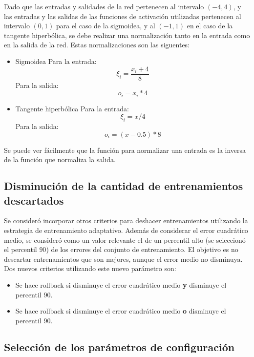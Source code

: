 \documentclass[a4paper,10pt]{article}
\begin{document}
        Dado que las entradas y salidades de la red pertenecen al intervalo $(-4, 4)$, y las entradas y las salidas de las funciones de activación utilizadas 
        pertenecen al intervalo $(0,1)$ para el caso de la sigmoidea, y al $(-1,1)$ en el caso de la tangente hiperbólica, se debe realizar una normalización 
        tanto en la entrada como en la salida de la red. Estas normalizaciones son las siguentes:

        \begin{itemize}
            \item Sigmoidea
                Para la entrada: \[ \xi_{i} = \frac{x_{i} + 4}{8} \]
                Para la salida: \[ o_{i} = x_{i} * 4 \]
            \item Tangente hiperbólica
                Para la entrada: \[ \xi_{i} = x / 4 \]
                Para la salida: \[ o_{i} = (x - 0.5) * 8 \]
        \end{itemize}

        Se puede ver fácilmente que la función para normalizar una entrada es la inversa de la función que normaliza la salida.

    \subsection{Disminución de la cantidad de entrenamientos descartados}

        \label{less_rollbacks}
        Se consideró incorporar otros criterios para deshacer entrenamientos utilizando la estrategia de entrenamiento adaptativo. Además de considerar el error cuadrático medio, 
        se consideró como un valor relevante el de un percentil alto (se seleccionó el percentil $90$) de los errores del conjunto de entrenamiento. El objetivo es no descartar 
        entrenamientos que son mejores, aunque el error medio no disminuya. Dos nuevos criterios utilizando este nuevo parámetro son:

        \begin{itemize}
            \item Se hace rollback si disminuye el error cuadrático medio \textbf{y} disminuye el percentil 90.
            \item Se hace rollback si disminuye el error cuadrático medio \textbf{o} disminuye el percentil 90.
        \end{itemize}

    \subsection{Selección de los parámetros de configuración}
\end{document}
